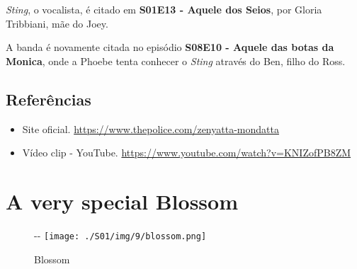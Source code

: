\emph{Sting}, o vocalista, é citado em
\textbf{\textcolor{primarycolor}{S01E13 - Aquele dos Seios}}, por Gloria
Tribbiani, mãe do Joey.

A banda é novamente citada no episódio
\textbf{\textcolor{primarycolor}{S08E10 - Aquele das botas da Monica}},
onde a Phoebe tenta conhecer o \emph{Sting} através do Ben, filho do
Ross.

\hypertarget{referuxeancias-2}{%
\subsection{Referências}\label{referuxeancias-2}}

\begin{itemize}
\tightlist
\item
  \sloppy Site oficial. \url{https://www.thepolice.com/zenyatta-mondatta}
\item
  \sloppy Vídeo clip - YouTube. \url{https://www.youtube.com/watch?v=KNIZofPB8ZM}
\end{itemize}

\hypertarget{a-very-special-blossom}{%
\section{A very special Blossom}\label{a-very-special-blossom}}

\begin{figure}[!ht]
  \begin{adjustwidth}{-\oddsidemargin-1in}{-\rightmargin}
    \centering
    \texttt{[image: ./S01/img/9/blossom.png]}
    \caption{Blossom\label{fig:blossom}}
  \end{adjustwidth}
\end{figure}

